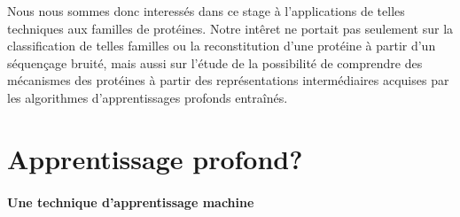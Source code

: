 \documentclass[a4paper, 11pt, onecolumn]{article}
\begin{document}
Nous nous sommes donc interessés dans ce stage à l'applications de telles techniques
aux familles de protéines. Notre intêret ne portait pas seulement sur la
classification de telles familles ou la reconstitution d'une protéine à partir
d'un séquençage bruité, mais aussi sur l'étude de la possibilité de comprendre
des mécanismes des protéines à partir des représentations intermédiaires acquises par les
algorithmes d'apprentissages profonds entraînés.

\newpage

\section{Apprentissage profond?}

\paragraph{Une technique d'apprentissage machine}
\end{document}

